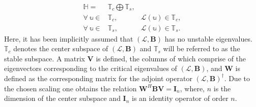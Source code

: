\begin{equation}
	\label{Hilbert_space_division}
	\begin{aligned}
		\mathds{H} =& \mathds{T}_{c}\bigoplus \mathds{T}_{s},& \\
		\forall \ \mathbb{u} \in& \mathds{T}_{c},& \mathcal{L}(\mathbb{u}) \in \mathds{T}_{c},  \\
		\forall \ \mathbb{u} \in& \mathds{T}_{s},& \mathcal{L}(\mathbb{u}) \in \mathds{T}_{s}.  
	\end{aligned} 
\end{equation}
Here, it has been implicitly assumed that $(\mathcal{L},\mathbf{B})$ has no unstable eigenvalues. $\mathds{T}_{c}$ denotes the center subspace of $(\mathcal{L},\mathbf{B})$ and $\mathds{T}_{s}$ will be referred to as the stable subspace. A matrix $\mathbf{V}$ is defined, the columns of which comprise of the eigenvectors corresponding to the critical eigenvalues of $(\mathcal{L},\mathbf{B})$, and $\mathbf{W}$ is defined as the corresponding matrix for the adjoint operator $(\mathcal{L},\mathbf{B})^{\dagger}$. Due to the chosen scaling one obtains the relation $\mathbf{W}^{H}\mathbf{B}\mathbf{V} = \mathbf{I}_{n}$, where, $n$ is the dimension of the center subspace and $\mathbf{I}_{n}$ is an identity operator of order $n$. 

